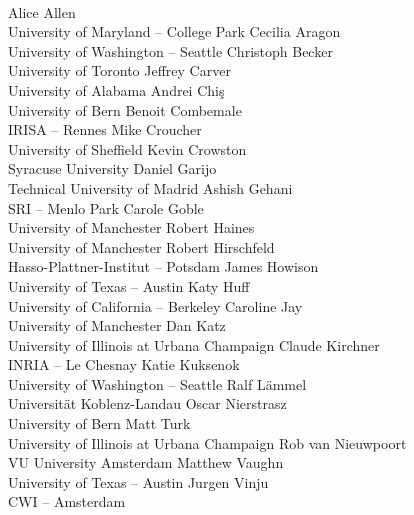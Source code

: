 \documentclass[a4paper,UKenglish]{dagman}
\begin{document}
\begin{participants}
\\
\participant Alice Allen\\ University of Maryland -- College Park
\participant Cecilia Aragon\\ University of Washington -- Seattle
\participant Christoph Becker\\ University of Toronto
\participant Jeffrey Carver\\ University of Alabama
\participant Andrei Chi\c{s}\\ University of Bern
\participant Benoit Combemale\\ IRISA -- Rennes
\participant Mike Croucher\\ University of Sheffield
\participant Kevin Crowston\\ Syracuse University
\participant Daniel Garijo\\ Technical University of Madrid
\participant Ashish Gehani\\ SRI -- Menlo Park
\participant Carole Goble\\ University of Manchester
\participant Robert Haines\\ University of Manchester
\participant Robert Hirschfeld\\ Hasso-Plattner-Institut -- Potsdam
\participant James Howison\\ University of Texas -- Austin
\participant Katy Huff\\ University of California -- Berkeley
\participant Caroline Jay\\ University of Manchester
\participant Dan Katz\\ University of Illinois at Urbana Champaign
\participant Claude Kirchner\\ INRIA -- Le Chesnay
\participant Katie Kuksenok\\ University of Washington -- Seattle
\participant Ralf L\"ammel\\ Universit\"at Koblenz-Landau
\participant Oscar Nierstrasz\\ University of Bern
\participant Matt Turk\\ University of Illinois at Urbana Champaign
\participant Rob van Nieuwpoort\\ VU University Amsterdam
\participant Matthew Vaughn\\ University of Texas -- Austin
\participant Jurgen Vinju\\ CWI -- Amsterdam
\end{participants}


%



\end{document}
